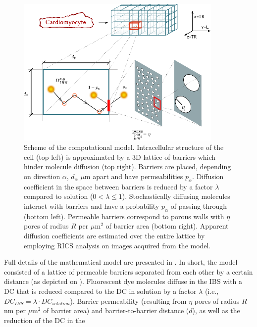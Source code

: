\begin{figure}[b!]
  \centering
    \includegraphics[width=10cm]{figures/model.pdf}
    \caption[Computational model scheme]{Scheme of the computational model. Intracellular
    structure of the cell (top left) is approximated by a 3D lattice of
    barriers which hinder molecule diffusion (top right). Barriers are
    placed, depending on direction $\alpha$, $d_\alpha$ $\mu$m apart and
    have permeabilities $p_\alpha$. Diffusion coefficient in the space
    between barriers is reduced by a factor $\lambda$ compared to
    solution ($0<\lambda\le1$). Stochastically diffusing molecules
    interact with barriers and have a probability $p_\alpha$ of passing
    through (bottom left). Permeable barriers correspond to porous
    walls with $\eta$ pores of radius $R$ per $\mu$m$^2$ of barrier area
    (bottom right). Apparent diffusion coefficients are estimated over
    the entire lattice by employing \ac{RICS} analysis on images
    acquired from the model.}
  \label{fig:model_scheme}
\end{figure}
Full details of the mathematical model are presented in \PaperIII. In
short, the model consisted of a lattice of permeable barriers 
separated from each other by a certain distance (as depicted on
\F{\ref{fig:model_scheme}}). Fluorescent dye
molecules diffuse in the \ac{IBS} with a \ac{DC} that
is reduced compared to the \ac{DC} in solution by a factor $\lambda$
(i.e., $DC_{IBS} = \lambda\cdot DC_{solution}$). Barrier permeability (resulting from $\eta$
pores of radius $R$ nm per $\mu$m$^2$ of barrier area) and
barrier-to-barrier distance ($d$), as well as the reduction of the \ac{DC} in the
